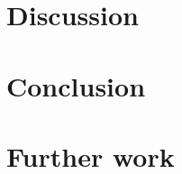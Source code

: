 \documentclass[../Main.tex]{subfiles}
\begin{document}
\section{Discussion}
\section{Conclusion}
\section{Further work}


\biblio %
\end{document}
